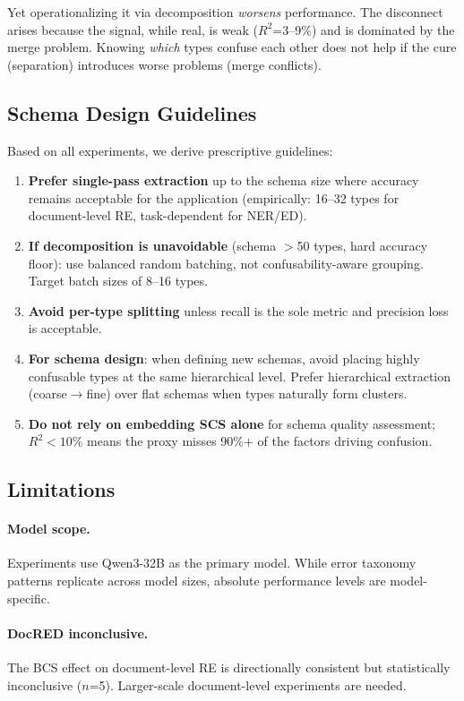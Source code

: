 \documentclass[11pt,a4paper]{article}
\begin{document}
Yet operationalizing it via decomposition \emph{worsens} performance. The disconnect arises because the signal, while real, is weak ($R^2$=3--9\%) and is dominated by the merge problem. Knowing \emph{which} types confuse each other does not help if the cure (separation) introduces worse problems (merge conflicts).

\subsection{Schema Design Guidelines}
\label{sec:guidelines}

Based on all experiments, we derive prescriptive guidelines:

\begin{enumerate}
\item \textbf{Prefer single-pass extraction} up to the schema size where accuracy remains acceptable for the application (empirically: 16--32 types for document-level RE, task-dependent for NER/ED).
\item \textbf{If decomposition is unavoidable} (schema $>$50 types, hard accuracy floor): use balanced random batching, not confusability-aware grouping. Target batch sizes of 8--16 types.
\item \textbf{Avoid per-type splitting} unless recall is the sole metric and precision loss is acceptable.
\item \textbf{For schema design}: when defining new schemas, avoid placing highly confusable types at the same hierarchical level. Prefer hierarchical extraction (coarse$\rightarrow$fine) over flat schemas when types naturally form clusters.
\item \textbf{Do not rely on embedding SCS alone} for schema quality assessment; $R^2 < 10\%$ means the proxy misses 90\%+ of the factors driving confusion.
\end{enumerate}

\subsection{Limitations}

\paragraph{Model scope.} Experiments use Qwen3-32B as the primary model. While error taxonomy patterns replicate across model sizes, absolute performance levels are model-specific.

\paragraph{DocRED inconclusive.} The BCS effect on document-level RE is directionally consistent but statistically inconclusive ($n$=5). Larger-scale document-level experiments are needed.
\end{document}

